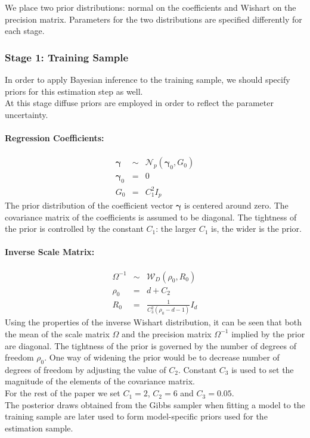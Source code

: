 We place two prior distributions: normal on the coefficients and Wishart on the  precision matrix. 
Parameters for the two distributions are specified differently for each stage.


\subsubsection{Stage 1: Training Sample}
In order to apply Bayesian inference to the training sample, we should specify priors for this estimation step as well. \\
At this stage diffuse priors are employed in order to reflect the parameter uncertainty.
\paragraph{Regression Coefficients:} 
\begin{eqnarray*}
	\boldsymbol{\gamma} &\sim& \mathcal{N}_{p}\left( \boldsymbol{\gamma}_{0},G_{0}\right) \\
	\boldsymbol{\gamma}_{0} &=& 0 \\ 
	G_{0} &=& C_{1}^{2}I_{p} 
\end{eqnarray*}
The prior distribution of the coefficient vector $\boldsymbol{\gamma}$ is centered around zero. 
The covariance matrix of the coefficients is assumed to be diagonal.
The tightness of the prior is controlled by the constant $C_{1}$: the larger $C_{1}$ is, the wider is the prior.
\paragraph{Inverse Scale Matrix:}
\begin{eqnarray*}
	\Omega^{-1} &\sim& \mathcal{W}_D\left(\rho_0, R_{0}\right) \\
	\rho_{0} &=& d + C_{2} \\ 
	R_{0} &=& \frac{1}{C_{3}^{2} (\rho_{0}-d-1)}I_{d}
\end{eqnarray*} 
Using the properties of the inverse Wishart distribution, it can be seen that both the mean  of the scale matrix $\Omega$ and the precision matrix $\Omega^{-1}$ implied by the prior are diagonal.
The tightness of the prior is governed by the number of degrees of freedom $\rho_{0}$. One way of widening the prior would be to decrease number of degrees of freedom by adjusting the value of $C_2$. 
Constant $C_{3}$ is used to set the magnitude of the elements of the covariance matrix. \\

For the rest of the paper we set $C_{1} = 2$, $C_{2} = 6$ and $C_{3} = 0.05$.\\
The posterior draws obtained from the Gibbs sampler when fitting a model to the training sample are later used to form model-specific priors used for the estimation sample.

